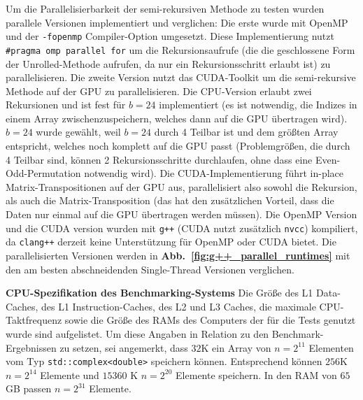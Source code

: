 \documentclass[10pt]{article}
\begin{document}
Um die Parallelisierbarkeit der semi-rekursiven Methode zu testen wurden parallele Versionen implementiert und verglichen:
Die erste wurde mit OpenMP und der {\tt -fopenmp} Compiler-Option umgesetzt. Diese Implementierung nutzt 
{\tt \#pragma omp parallel for} um die Rekursionsaufrufe (die die geschlossene Form der Unrolled-Methode aufrufen, 
da nur ein Rekursionsschritt erlaubt ist) zu parallelisieren. Die zweite Version nutzt das CUDA-Toolkit um die semi-rekursive Methode 
auf der GPU zu parallelisieren. Die CPU-Version erlaubt zwei Rekursionen und ist fest für $b=24$ implementiert 
(es ist notwendig, die Indizes in einem Array zwischenzuspeichern, welches dann auf die GPU übertragen wird).
$b=24$ wurde gewählt, weil $b=24$ durch 4 Teilbar ist und dem größten Array entspricht, welches noch komplett auf die GPU passt
(Problemgrößen, die durch 4 Teilbar sind, können 2 Rekursionsschritte durchlaufen, ohne dass eine Even-Odd-Permutation notwendig wird).
Die CUDA-Implementierung führt in-place Matrix-Transpositionen auf der GPU aus\cite{harris:cuda}, parallelisiert also sowohl 
die Rekursion, als auch die Matrix-Transposition (das hat den zusätzlichen Vorteil, dass die Daten nur 
einmal auf die GPU übertragen werden müssen). Die OpenMP Version und die CUDA version wurden mit {\tt g++} (CUDA nutzt zusätzlich {\tt nvcc})
kompiliert, da {\tt clang++} derzeit keine Unterstützung für OpenMP oder CUDA bietet. Die parallelisierten Versionen werden in 
{\bf Abb.~\ref{fig:g++_parallel_runtimes}} mit den am besten abschneidenden Single-Thread Versionen verglichen.


\begin{table}[ht!]
  \centering
  
\caption{ {\bf CPU-Spezifikation des Benchmarking-Systems} 
    Die Größe des L1 Data-Caches, des L1 Instruction-Caches, des L2 und L3 Caches,
    die maximale CPU-Taktfrequenz sowie die Größe des RAMs des Computers der für 
    die Tests genutzt wurde sind aufgelistet. Um diese Angaben in Relation zu den 
    Benchmark-Ergebnissen zu setzen, sei angemerkt, dass $32$K ein Array von  
    $n=2^{11}$ Elementen vom Typ {\tt std::complex<double>} speichern können. 
    Entsprechend können $256$K $n=2^{14}$ Elemente und $15360$ K $n=2^{20}$ Elemente speichern.
    In den RAM von $65$GB passen $n=2^{31}$ Elemente. 
    \label{table:cpu_spec}
}
\end{table}
\end{document}
